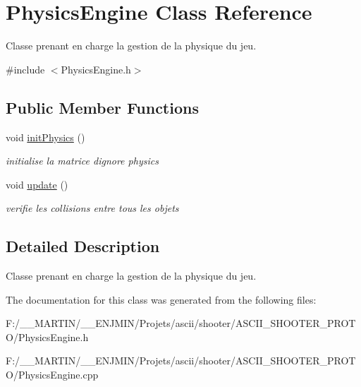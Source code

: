\hypertarget{class_physics_engine}{}\section{Physics\+Engine Class Reference}
\label{class_physics_engine}


Classe prenant en charge la gestion de la physique du jeu.  




{\ttfamily \#include $<$Physics\+Engine.\+h$>$}

\subsection*{Public Member Functions}
\begin{DoxyCompactItemize}
\item 
\hypertarget{class_physics_engine_a1051e5a80e27864cc8d9c6cfd696c29a}{}\label{class_physics_engine_a1051e5a80e27864cc8d9c6cfd696c29a} 
void \hyperlink{class_physics_engine_a1051e5a80e27864cc8d9c6cfd696c29a}{init\+Physics} ()
\begin{DoxyCompactList}\small\item\em initialise la matrice d\textquotesingle{}ignore physics \end{DoxyCompactList}\item 
\hypertarget{class_physics_engine_ac4951e3070893b809ec9b8888ad92e07}{}\label{class_physics_engine_ac4951e3070893b809ec9b8888ad92e07} 
void \hyperlink{class_physics_engine_ac4951e3070893b809ec9b8888ad92e07}{update} ()
\begin{DoxyCompactList}\small\item\em verifie les collisions entre tous les objets \end{DoxyCompactList}\end{DoxyCompactItemize}


\subsection{Detailed Description}
Classe prenant en charge la gestion de la physique du jeu. 

The documentation for this class was generated from the following files\+:\begin{DoxyCompactItemize}
\item 
F\+:/\+\_\+\+\_\+\+M\+A\+R\+T\+I\+N/\+\_\+\+\_\+\+E\+N\+J\+M\+I\+N/\+Projets/ascii/shooter/\+A\+S\+C\+I\+I\+\_\+\+S\+H\+O\+O\+T\+E\+R\+\_\+\+P\+R\+O\+T\+O/Physics\+Engine.\+h\item 
F\+:/\+\_\+\+\_\+\+M\+A\+R\+T\+I\+N/\+\_\+\+\_\+\+E\+N\+J\+M\+I\+N/\+Projets/ascii/shooter/\+A\+S\+C\+I\+I\+\_\+\+S\+H\+O\+O\+T\+E\+R\+\_\+\+P\+R\+O\+T\+O/Physics\+Engine.\+cpp\end{DoxyCompactItemize}
